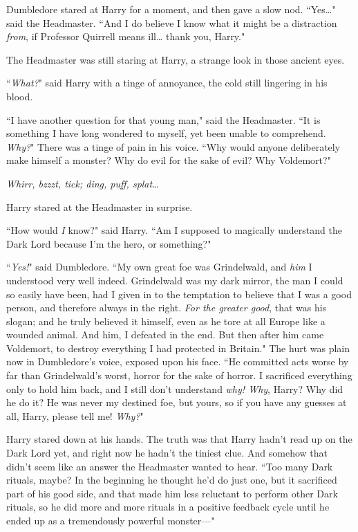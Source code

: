 Dumbledore stared at Harry for a moment, and then gave a slow nod. ``Yes{\ldots}" said the Headmaster. ``And I do believe I know what it might be a distraction \emph{from}, if Professor Quirrell means ill{\ldots} thank you, Harry."

The Headmaster was still staring at Harry, a strange look in those ancient eyes.

``\emph{What?}" said Harry with a tinge of annoyance, the cold still lingering in his blood.

``I have another question for that young man," said the Headmaster. ``It is something I have long wondered to myself, yet been unable to comprehend. \emph{Why?}" There was a tinge of pain in his voice. ``Why would anyone deliberately make himself a monster? Why do evil for the sake of evil? Why Voldemort?"

\later

\emph{Whirr, bzzzt, tick; ding, puff, splat{\ldots}}

Harry stared at the Headmaster in surprise.

``How would \emph{I} know?" said Harry. ``Am I supposed to magically understand the Dark Lord because I'm the hero, or something?"

``\emph{Yes!}" said Dumbledore. ``My own great foe was Grindelwald, and \emph{him} I understood very well indeed. Grindelwald was my dark mirror, the man I could so easily have been, had I given in to the temptation to believe that I was a good person, and therefore always in the right. \emph{For the greater good}, that was his slogan; and he truly believed it himself, even as he tore at all Europe like a wounded animal. And him, I defeated in the end. But then after him came Voldemort, to destroy everything I had protected in Britain." The hurt was plain now in Dumbledore's voice, exposed upon his face. ``He committed acts worse by far than Grindelwald's worst, horror for the sake of horror. I sacrificed everything only to hold him back, and I still don't understand \emph{why! Why}, Harry? Why did he do it? He was never my destined foe, but yours, so if you have any guesses at all, Harry, please tell me! \emph{Why?}"

Harry stared down at his hands. The truth was that Harry hadn't read up on the Dark Lord yet, and right now he hadn't the tiniest clue. And somehow that didn't seem like an answer the Headmaster wanted to hear. ``Too many Dark rituals, maybe? In the beginning he thought he'd do just one, but it sacrificed part of his good side, and that made him less reluctant to perform other Dark rituals, so he did more and more rituals in a positive feedback cycle until he ended up as a tremendously powerful monster—"

